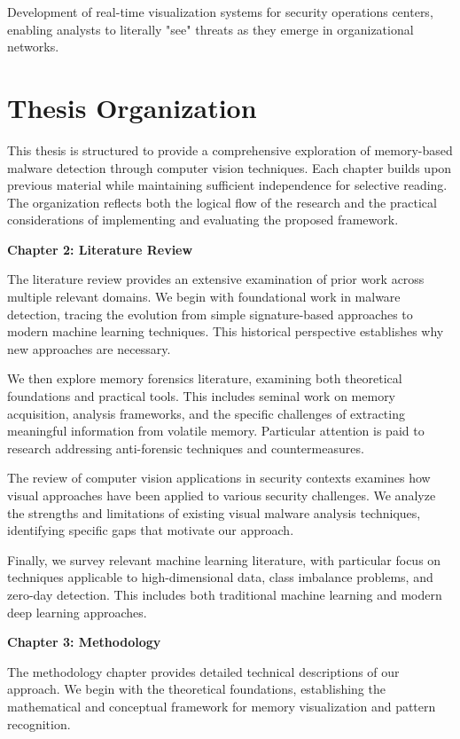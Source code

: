 Development of real-time visualization systems for security operations centers, enabling analysts to literally "see" threats as they emerge in organizational networks.

\section{Thesis Organization}
\label{sec:organization}

This thesis is structured to provide a comprehensive exploration of memory-based malware detection through computer vision techniques. Each chapter builds upon previous material while maintaining sufficient independence for selective reading. The organization reflects both the logical flow of the research and the practical considerations of implementing and evaluating the proposed framework.

\textbf{Chapter 2: Literature Review}

The literature review provides an extensive examination of prior work across multiple relevant domains. We begin with foundational work in malware detection, tracing the evolution from simple signature-based approaches to modern machine learning techniques. This historical perspective establishes why new approaches are necessary.

We then explore memory forensics literature, examining both theoretical foundations and practical tools. This includes seminal work on memory acquisition, analysis frameworks, and the specific challenges of extracting meaningful information from volatile memory. Particular attention is paid to research addressing anti-forensic techniques and countermeasures.

The review of computer vision applications in security contexts examines how visual approaches have been applied to various security challenges. We analyze the strengths and limitations of existing visual malware analysis techniques, identifying specific gaps that motivate our approach.

Finally, we survey relevant machine learning literature, with particular focus on techniques applicable to high-dimensional data, class imbalance problems, and zero-day detection. This includes both traditional machine learning and modern deep learning approaches.

\textbf{Chapter 3: Methodology}

The methodology chapter provides detailed technical descriptions of our approach. We begin with the theoretical foundations, establishing the mathematical and conceptual framework for memory visualization and pattern recognition.

